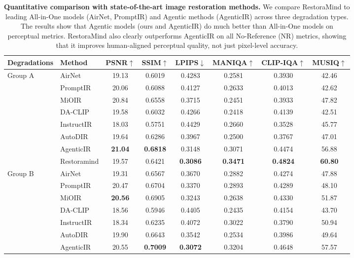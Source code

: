\begin{table}[h!]
\centering
\caption{\textbf{Quantitative comparison with state-of-the-art image restoration methods.} We compare RestoraMind to leading All-in-One models (AirNet, PromptIR) and Agentic methods (AgenticIR) across three degradation types. The results show that Agentic models (ours and AgenticIR) do much better than All-in-One models on perceptual metrics. RestoraMind also clearly outperforms AgenticIR on all No-Reference (NR) metrics, showing that it improves human-aligned perceptual quality, not just pixel-level accuracy.}
\label{tab:performance_comparison_v2}
\begin{tabular}{llcccccc}
\toprule
Degradations & Method & PSNR$\uparrow$ & SSIM$\uparrow$ & LPIPS$\downarrow$ & MANIQA$\uparrow$ & CLIP-IQA$\uparrow$ & MUSIQ$\uparrow$ \\
\midrule
\multirow{8}{*}{Group A}
& AirNet & 19.13 & 0.6019 & 0.4283 & 0.2581 & 0.3930 & 42.46 \\
& PromptIR & 20.06 & 0.6088 & 0.4127 & 0.2633 & 0.4013 & 42.62 \\
& MiOIR & 20.84 & 0.6558 & 0.3715 & 0.2451 & 0.3933 & 47.82 \\
& DA-CLIP & 19.58 & 0.6032 & 0.4266 & 0.2418 & 0.4139 & 42.51 \\
& InstructIR & 18.03 & 0.5751 & 0.4429 & 0.2660 & 0.3528 & 45.77 \\
& AutoDIR & 19.64 & 0.6286 & 0.3967 & 0.2500 & 0.3767 & 47.01 \\
& AgenticIR & \textbf{21.04} & \textbf{0.6818} & 0.3148 & 0.3071 & 0.4474 & 56.88 \\
& Restoramind & 19.57 & 0.6421 & \textbf{0.3086} & \textbf{0.3471} & \textbf{0.4824} & \textbf{60.80} \\
\midrule
\multirow{8}{*}{Group B}
& AirNet & 19.31 & 0.6567 & 0.3670 & 0.2882 & 0.4274 & 47.88 \\
& PromptIR & 20.47 & 0.6704 & 0.3370 & 0.2893 & 0.4289 & 48.10 \\
& MiOIR & \textbf{20.56} & 0.6905 & 0.3243 & 0.2638 & 0.4330 & 51.87 \\
& DA-CLIP & 18.56 & 0.5946 & 0.4405 & 0.2435 & 0.4154 & 43.70 \\
& InstructIR & 18.34 & 0.6235 & 0.4072 & 0.3022 & 0.3790 & 50.94 \\
& AutoDIR & 19.90 & 0.6643 & 0.3542 & 0.2534 & 0.3986 & 49.64 \\
& AgenticIR & 20.55 & \textbf{0.7009} & \textbf{0.3072} & 0.3204 & 0.4648 & 57.57 \\

\end{tabular}
\end{table}
